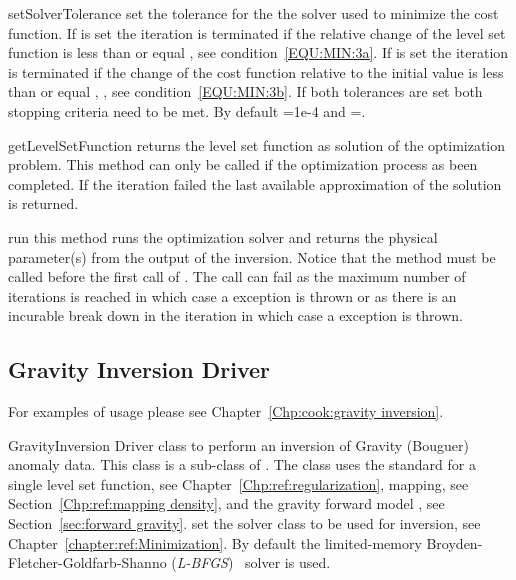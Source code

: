 \begin{methoddesc}[InversionDriver]{setSolverTolerance}{ }
set the tolerance for the the solver used to minimize the cost function. If  is set the iteration is terminated 
if the relative change of the level set function is less than or equal , see condition~\ref{EQU:MIN:3a}. 
If  is set the iteration is terminated if the change of the cost
function relative to the initial value is less than or equal , , see condition~\ref{EQU:MIN:3b}.
If both tolerances are set both stopping criteria need to be met.
By default =1e-4 and =\None.
\end{methoddesc}

\begin{methoddesc}[InversionDriver]{getLevelSetFunction}{}
returns the level set function as solution of the optimization problem.
This method can only be called if the optimization process as been completed.
If the iteration failed the last available approximation of the solution is returned.
\end{methoddesc}
        
\begin{methoddesc}[InversionDriver]{run}{}
this method runs the optimization solver and returns the physical parameter(s)
from the output of the inversion. Notice that the  method must be
called before the first call of .
The call can fail as the maximum number of iterations is reached in which case
a  exception is thrown or as there is an
incurable break down in the iteration in which case a  exception is thrown. 
\end{methoddesc}

\subsection{Gravity Inversion Driver}
For examples of usage please see Chapter~\ref{Chp:cook:gravity inversion}.

\begin{classdesc}{GravityInversion}{}
Driver class to perform an inversion of Gravity (Bouguer) anomaly data.
This class is a sub-class of . The class uses the
standard  for a single level set function,
see Chapter~\ref{Chp:ref:regularization},  mapping,
see Section~\ref{Chp:ref:mapping density}, and the gravity forward model
, see Section~\ref{sec:forward gravity}.
 set the solver class to be used for inversion,
see Chapter~\ref{chapter:ref:Minimization}.
 By default the limited-memory Broyden-Fletcher-Goldfarb-Shanno (\emph{L-BFGS})~\cite{Nocedal1980} solver is used.

\end{classdesc}


